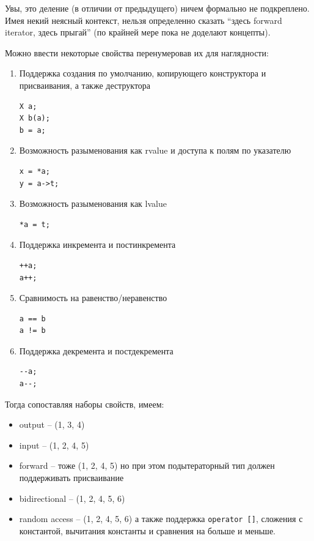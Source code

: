 \documentclass[a4paper,12pt,oneside]{article}
\begin{document}
Увы, это деление (в отличии от предыдущего) ничем формально не подкреплено. Имея некий неясный контекст, нельзя определенно сказать ``здесь forward iterator, здесь прыгай'' (по крайней мере пока не доделают концепты).

Можно ввести некоторые свойства перенумеровав их для наглядности:

\begin {enumerate}
\item
Поддержка создания по умолчанию, копирующего конструктора и присваивания, а также деструктора

\begin{lstlisting}
X a;
X b(a);
b = a;
\end{lstlisting}

\item
Возможность разыменования как rvalue и доступа к полям по указателю

\begin{lstlisting}
x = *a;
y = a->t;
\end{lstlisting}

\item
Возможность разыменования как lvalue

\begin{lstlisting}
*a = t;
\end{lstlisting}

\item
Поддержка инкремента и постинкремента

\begin{lstlisting}
++a;
a++;
\end{lstlisting}

\item
Сравнимость на равенство/неравенство

\begin{lstlisting}
a == b
a != b
\end{lstlisting}

\item
Поддержка декремента и постдекремента

\begin{lstlisting}
--a;
a--;
\end{lstlisting}

\end {enumerate}

Тогда сопоставляя наборы свойств, имеем:

\begin {itemize}
\item output -- (1, 3, 4)
\item input -- (1, 2, 4, 5)
\item forward -- тоже (1, 2, 4, 5) но при этом подытераторный тип должен поддерживать присваивание
\item bidirectional -- (1, 2, 4, 5, 6)
\item random access -- (1, 2, 4, 5, 6) а также поддержка \lstinline!operator []!, сложения с константой, вычитания константы и сравнения на больше и меньше.
\end {itemize}
\end{document}
